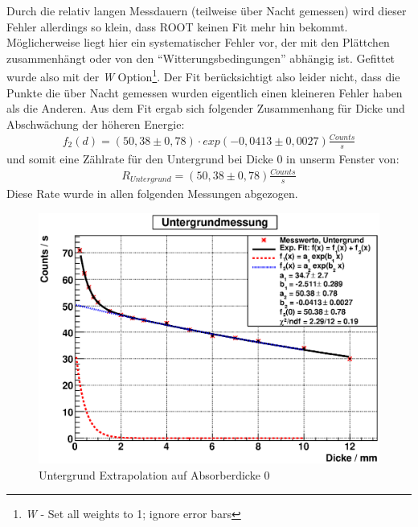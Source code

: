 \documentclass[12pt]{article}
\begin{document}
Durch die relativ langen Messdauern (teilweise über Nacht gemessen) wird dieser Fehler allerdings so klein, dass ROOT keinen Fit mehr hin bekommt.
Möglicherweise liegt hier ein systematischer Fehler vor, der mit den Plättchen zusammenhängt oder von den ``Witterungsbedingungen'' abhängig ist.
Gefittet wurde also mit der \textit{W} Option\footnote{\textit{W} - Set all weights to 1; ignore error bars}. Der Fit berücksichtigt also leider nicht, dass die Punkte die über Nacht gemessen wurden eigentlich einen kleineren Fehler haben als die Anderen. Aus dem Fit ergab sich folgender Zusammenhang für Dicke und Abschwächung der höheren Energie:
\begin{align*}
 f_2 (d) = (50,38 \pm 0,78) \cdot exp (-0,0413 \pm 0,0027) \frac{Counts}{s}
\end{align*}
 und somit eine Zählrate für den Untergrund bei Dicke 0 in unserm Fenster von:
\begin{align*}
 R_{Untergrund} = (50,38 \pm 0,78) \frac{Counts}{s} 
\end{align*}
Diese Rate wurde in allen folgenden Messungen abgezogen.
       

\begin{figure}[H]
 \includegraphics[width=0.9\linewidth]{pictures/untergrund.eps}
 \caption{Untergrund Extrapolation auf Absorberdicke 0}
\end{figure}
\end{document}

